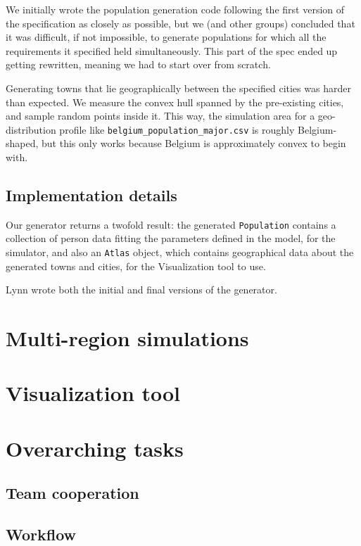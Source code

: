 \documentclass[a4paper,12pt]{article}
\begin{document}
We initially wrote the population generation code following the first version of the specification as closely as possible, but we (and other groups) concluded that it was difficult, if not impossible, to generate populations for which all the requirements it specified held simultaneously. This part of the spec ended up getting rewritten, meaning we had to start over from scratch.

Generating towns that lie geographically between the specified cities was harder than expected. We measure the convex hull spanned by the pre-existing cities, and sample random points inside it. This way, the simulation area for a geo-distribution profile like \texttt{belgium\_population\_major.csv} is roughly Belgium-shaped, but this only works because Belgium is approximately convex to begin with.

\subsection{Implementation details}
Our generator returns a twofold result: the generated \texttt{Population} contains a collection of person data fitting the parameters defined in the model, for the simulator, and also an \texttt{Atlas} object, which contains geographical data about the generated towns and cities, for the Visualization tool to use.

Lynn wrote both the initial and final versions of the generator.

\section{Multi-region simulations}

\section{Visualization tool}

\section{Overarching tasks}
\subsection{Team cooperation} %
\subsection{Workflow} %
\end{document}
